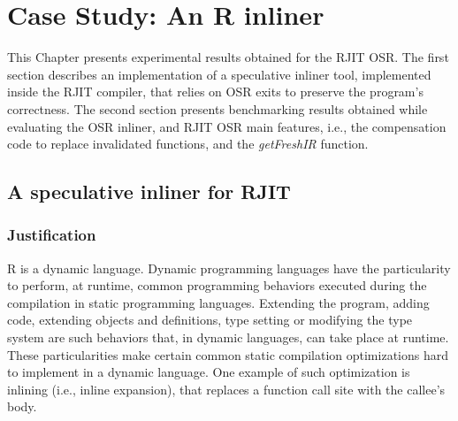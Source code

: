 
\chapter{Case Study: An R inliner} %

\label{Chapter5} %


\newcommand{\keyword}[1]{\textbf{#1}}
\newcommand{\tabhead}[1]{\textbf{#1}}
\newcommand{\code}[1]{\texttt{#1}}
\newcommand{\file}[1]{\texttt{\bfseries#1}}
\newcommand{\option}[1]{\texttt{\itshape#1}}

This Chapter presents experimental results obtained for the RJIT OSR.
The first section describes an implementation of a speculative inliner tool, implemented inside the RJIT compiler, that relies on OSR exits to preserve the program's correctness.
The second section presents benchmarking results obtained while evaluating the OSR inliner, and RJIT OSR main features, i.e., the compensation code to replace invalidated functions, and the \textit{getFreshIR} function.\\

\section{A speculative inliner for RJIT}
\subsection{Justification}\label{section:justificationinlining}
R is a dynamic language. 
Dynamic programming languages have the particularity to perform, at runtime, common programming behaviors executed during the compilation in static programming languages.
Extending the program, adding code, extending objects and definitions, type setting or modifying the type system are such behaviors that, in dynamic languages, can take place at runtime.
These particularities make certain common static compilation optimizations hard to implement in a dynamic language.
One example of such optimization is inlining (i.e., inline expansion), that replaces a function call site with the callee's body.\\

